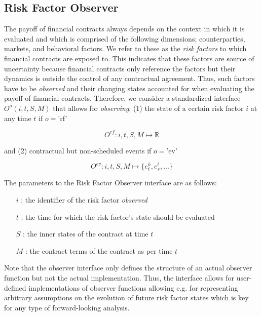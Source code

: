\documentclass[9pt,oneside]{amsart}
\newcommand{\Real}{\mathbb{R}}
\newcommand{\obsfull}[5]{O^{#1}(#2,#3,#4,#5)}
\newcommand{\obsfunc}[1]{O^{#1}}
\begin{document}
\setlength{\columnsep}{20pt}
\begin{multicols}{2}



\section{Risk Factor Observer}\label{sec:rfobserver}

The payoff of financial contracts always depends on the context in which it is evaluated and which is comprised of the following dimensions; counterparties, markets, and behavioral factors. We refer to these as the \textit{risk factors} to which financial contracts are exposed to. This indicates that these factors are source of uncertainty because financial contracts only reference the factors but their dynamics is outside the control of any contractual agreement. Thus, such factors have to be \textit{observed} and their changing states accounted for when evaluating the payoff of financial contracts. Therefore, we consider a standardized interface $\obsfull{o}{i}{t}{S}{M}$ that allows for \textit{observing}; (1) the state of a certain risk factor $i$ at any time $t$ if $o=$'rf'

\[
	\obsfunc{rf}: i,t,S,M \mapsto \Real
\]

and (2) contractual but non-scheduled events if $o=$'ev'

\[
	\obsfunc{ev}: i,t,S,M \mapsto \{e_t^{k},e_s^{l},...\}
\]

The parameters to the Risk Factor Observer interface are as follows:

\begin{itemize}
	\item[$i$]: the identifier of the risk factor \textit{observed}

	\item[$t$]: the time for which the risk factor’s state should be evaluated

	\item [$S$]: the inner states of the contract at time $t$

	\item [$M$]: the contract terms of the contract as per time $t$
\end{itemize}

Note that the observer interface only defines the structure of an actual observer function but not the actual implementation. Thus, the interface allows for user-defined implementations of observer functions allowing e.g. for representing arbitrary assumptions on the evolution of future risk factor states which is key for any type of forward-looking analysis.


\end{multicols}
\end{document}
